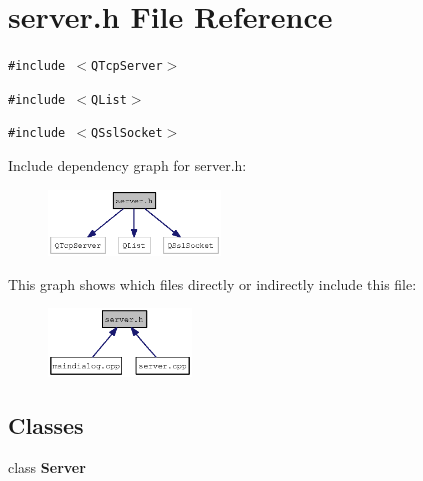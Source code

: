 \section{server.h File Reference}
\label{server_8h}
{\tt \#include $<$QTcpServer$>$}\par
{\tt \#include $<$QList$>$}\par
{\tt \#include $<$QSslSocket$>$}\par


Include dependency graph for server.h:\nopagebreak
\begin{figure}[H]
\begin{center}
\leavevmode
\includegraphics[width=130pt]{server_8h__incl}
\end{center}
\end{figure}


This graph shows which files directly or indirectly include this file:\nopagebreak
\begin{figure}[H]
\begin{center}
\leavevmode
\includegraphics[width=108pt]{server_8h__dep__incl}
\end{center}
\end{figure}
\subsection*{Classes}
\begin{CompactItemize}
\item 
class {\bf Server}
\end{CompactItemize}

